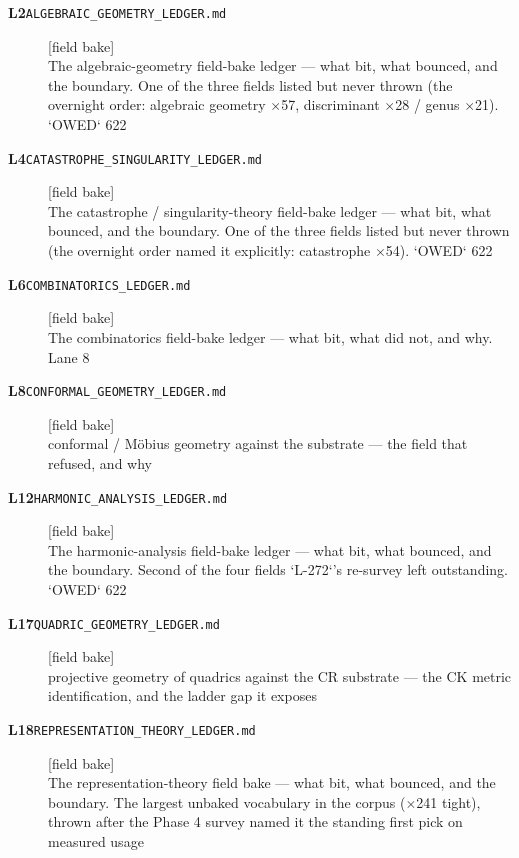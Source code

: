 \begin{description}
\item[\textbf{L2}\quad\texttt{ALGEBRAIC\_GEOMETRY\_LEDGER.md}]\hfill\textsf{[field bake]}\\
The algebraic-geometry field-bake ledger --- what bit, what bounced, and the boundary. One of the three fields listed but never thrown (the overnight order: algebraic geometry $\times$57, discriminant $\times$28 / genus $\times$21). `OWED` 622
\item[\textbf{L4}\quad\texttt{CATASTROPHE\_SINGULARITY\_LEDGER.md}]\hfill\textsf{[field bake]}\\
The catastrophe / singularity-theory field-bake ledger --- what bit, what bounced, and the boundary. One of the three fields listed but never thrown (the overnight order named it explicitly: catastrophe $\times$54). `OWED` 622
\item[\textbf{L6}\quad\texttt{COMBINATORICS\_LEDGER.md}]\hfill\textsf{[field bake]}\\
The combinatorics field-bake ledger --- what bit, what did not, and why. Lane 8
\item[\textbf{L8}\quad\texttt{CONFORMAL\_GEOMETRY\_LEDGER.md}]\hfill\textsf{[field bake]}\\
conformal / M\"obius geometry against the substrate --- the field that refused, and why
\item[\textbf{L12}\quad\texttt{HARMONIC\_ANALYSIS\_LEDGER.md}]\hfill\textsf{[field bake]}\\
The harmonic-analysis field-bake ledger --- what bit, what bounced, and the boundary. Second of the four fields `L-272`'s re-survey left outstanding. `OWED` 622
\item[\textbf{L17}\quad\texttt{QUADRIC\_GEOMETRY\_LEDGER.md}]\hfill\textsf{[field bake]}\\
projective geometry of quadrics against the CR substrate --- the CK metric identification, and the ladder gap it exposes
\item[\textbf{L18}\quad\texttt{REPRESENTATION\_THEORY\_LEDGER.md}]\hfill\textsf{[field bake]}\\
The representation-theory field bake --- what bit, what bounced, and the boundary. The largest unbaked vocabulary in the corpus ($\times$241 tight), thrown after the Phase 4 survey named it the standing first pick on measured usage

\end{description}
